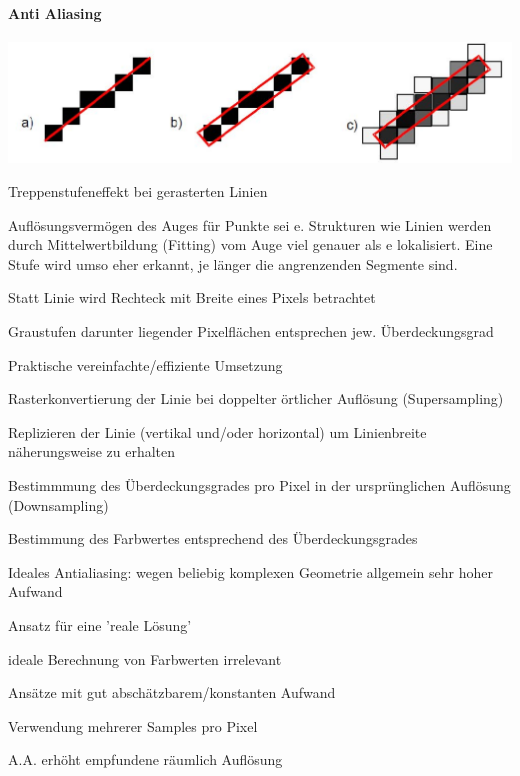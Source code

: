 \documentclass[landscape]{article}
\begin{document}
\begin{multicols}{3}
  \paragraph{Anti Aliasing}
  \begin{center}
    \includegraphics[width=.5\linewidth]{Assets/Computergrafik_Antialiasing}
  \end{center}
  \begin{itemize*}
    \item Treppenstufeneffekt bei gerasterten Linien
    \item Auflösungsvermögen des Auges für Punkte sei e. Strukturen wie Linien werden durch Mittelwertbildung (Fitting) vom Auge viel genauer als e lokalisiert. Eine Stufe wird umso eher erkannt, je länger die angrenzenden Segmente sind.
    \begin{itemize*}
      \item Statt Linie wird Rechteck mit Breite eines Pixels betrachtet
      \item Graustufen darunter liegender Pixelflächen entsprechen jew. Überdeckungsgrad
    \end{itemize*}
    \item Praktische vereinfachte/effiziente Umsetzung
    \begin{itemize*}
      \item Rasterkonvertierung der Linie bei doppelter örtlicher Auflösung (Supersampling)
      \item Replizieren der Linie (vertikal und/oder horizontal) um Linienbreite näherungsweise zu erhalten
      \item Bestimmmung des Überdeckungsgrades pro Pixel in der ursprünglichen Auflösung (Downsampling)
      \item Bestimmung des Farbwertes entsprechend des Überdeckungsgrades
    \end{itemize*}
    \item Ideales Antialiasing: wegen beliebig komplexen Geometrie allgemein sehr hoher Aufwand
    \item Ansatz für eine 'reale Lösung'
    \begin{itemize*}
      \item ideale Berechnung von Farbwerten irrelevant
      \item Ansätze mit gut abschätzbarem/konstanten Aufwand
      \item Verwendung mehrerer Samples pro Pixel
    \end{itemize*}
    \item A.A. erhöht empfundene räumlich Auflösung
  \end{itemize*}
  

\end{multicols}
\end{document}
